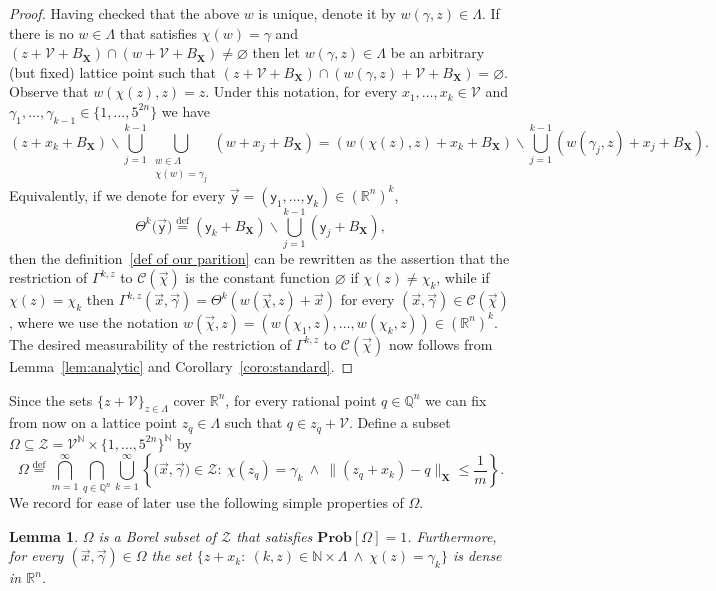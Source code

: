 \documentclass[11pt,reqno]{amsart}
\renewcommand{\le}{\leqslant}
\renewcommand{\setminus}{\smallsetminus}
\newcommand{\X}{\mathbf X}
\newcommand{\R}{\mathbb R}
\newtheorem{lemma}[theorem]{Lemma}
\theoremstyle{remark}
\renewcommand{\subset}{\subseteq}
\newcommand{\N}{\mathbb N}
\newcommand{\eqdef}{\stackrel{\mathrm{def}}{=}}
\renewcommand{\Pr}{\mathbf{Prob}}
\renewcommand{\emptyset}{\varnothing}
\renewcommand{\1}{\mathbf 1}
\newcommand{\ZZ}{\mathcal{Z}}
\newcommand{\Q}{\mathbb{Q}}
\newcommand{\DD}{\mathscr{V}}
\newcommand{\yy}{\mathsf{y}}
\begin{document}
\begin{proof}
Having checked that the above $w$ is unique, denote it by $w(\gamma,z)\in \Lambda$. If there is no $w\in \Lambda$ that satisfies $\chi(w)=\gamma$ and $(z+\DD+B_{\X})\cap (w+\DD+B_{\X})\neq \emptyset$ then let $w(\gamma,z)\in\Lambda$ be an arbitrary (but fixed) lattice point such that $(z+\DD+B_{\X})\cap (w(\gamma,z)+\DD+B_{\X})= \emptyset$. Observe that $w(\chi(z),z)=z$. Under  this notation, for every  $x_1,\ldots,x_k\in \DD$ and $\gamma_1,\ldots,\gamma_{k-1}\in  \{1,\ldots,5^{2n}\}$ we have
\begin{equation*}
(z+x_k+B_{\X}) \setminus \bigcup_{j=1}^{k-1}\bigcup_{\substack{w\in \Lambda\\ \chi(w)=\gamma_j}}(w+x_j+B_{\X})=
(w(\chi(z),z)+x_k+B_{\X}) \setminus \bigcup_{j=1}^{k-1}(w(\gamma_j,z)+x_j+B_{\X}).
\end{equation*}
Equivalently, if we denote for every $\vec{\yy}=(\yy_1,\ldots,\yy_k)\in (\R^n)^k$,
$$
\Theta^k\big(\vec{\yy}\big)\eqdef (\yy_k+B_{\X}) \setminus \bigcup_{j=1}^{k-1}(\yy_j+B_{\X}),
$$
then the definition~\eqref{def of our parition} can be rewritten as the assertion that the restriction of $\Gamma^{k,z}$ to $\mathcal{C}(\vec{\chi})$ is the constant function $\emptyset$ if $\chi(z)\neq \chi_k$, while if $\chi(z)=\chi_k$ then    $\Gamma^{k,z}(\vec{x},\vec{\gamma})= \Theta^k(w(\vec{\chi},z)+\vec{x})$  for every $(\vec{x},\vec{\gamma})\in \mathcal{C}(\vec{\chi})$, where we use the notation $w(\vec{\chi},z)=(w(\chi_1,z),\ldots, w(\chi_k,z))\in (\R^n)^k$. The desired measurability of the restriction of $\Gamma^{k,z}$ to  $\mathcal{C}(\vec{\chi})$ now follows from Lemma~\ref{lem:analytic} and Corollary~\ref{coro:standard}.
\end{proof}


Since the sets $\{z+\DD\}_{z\in \Lambda}$ cover $\R^n$, for every rational point $q\in \Q^n$ we can fix from now on a lattice point $z_{q}\in \Lambda$ such that $q\in z_q+\DD$. Define a  subset $\Omega \subset \ZZ=\DD^\N\times \{1,\ldots,5^{2n}\}^\N$ by
\begin{equation}\label{eq:def Omega}
\Omega\eqdef \bigcap_{m=1}^\infty \bigcap_{q\in \Q^n} \bigcup_{k=1}^\infty \left\{\big(\vec{x},\vec{\gamma}\big)\in
\ZZ:\ \chi(z_q)= \gamma_k\ \wedge\ \|(z_q+x_k)-q\|_{\X}\le \frac{1}{m}\right\}.
\end{equation}
We record for ease of later use the following simple properties of $\Omega$.


\begin{lemma}\label{lem:Omega properties}
$\Omega$ is a Borel subset of $\ZZ$ that satisfies $\Pr[\Omega]=1$. Furthermore, for every $(\vec{x},\vec{\gamma})\in \Omega$ the set $\{z+x_k:\ (k,z)\in \N\times \Lambda\ \wedge\  \chi(z)=\gamma_k\}$ is dense in $\R^n$.
\end{lemma}
\end{document}
